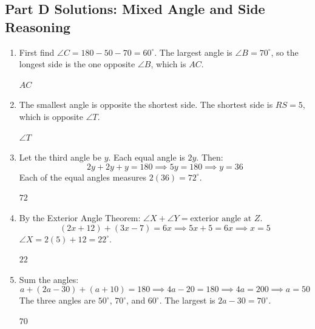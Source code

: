 \documentclass[14pt]{extarticle}
\begin{document}
\subsection*{Part D Solutions: Mixed Angle and Side Reasoning}
\begin{enumerate}
  \item First find \(\angle C = 180 - 50 - 70 = 60^\circ\). The largest angle is \(\angle B = 70^\circ\), so the longest side is the one opposite \(\angle B\), which is \(AC\).

  \(\boxed{AC}\)

  \item The smallest angle is opposite the shortest side. The shortest side is \(RS = 5\), which is opposite \(\angle T\).

  \(\boxed{\angle T}\)

  \item Let the third angle be \(y\). Each equal angle is \(2y\). Then:
  \[
  2y + 2y + y = 180 \implies 5y = 180 \implies y = 36
  \]
  Each of the equal angles measures \(2(36) = 72^\circ\).

  \(\boxed{72}\)

  \item By the Exterior Angle Theorem: \(\angle X + \angle Y = \text{exterior angle at } Z\).
  \[
  (2x + 12) + (3x - 7) = 6x \implies 5x + 5 = 6x \implies x = 5
  \]
  \(\angle X = 2(5) + 12 = 22^\circ\).

  \(\boxed{22}\)

  \item Sum the angles:
  \[
  a + (2a - 30) + (a + 10) = 180 \implies 4a - 20 = 180 \implies 4a = 200 \implies a = 50
  \]
  The three angles are \(50^\circ\), \(70^\circ\), and \(60^\circ\). The largest is \(2a - 30 = 70^\circ\).

  \(\boxed{70}\)
\end{enumerate}
\end{document}
